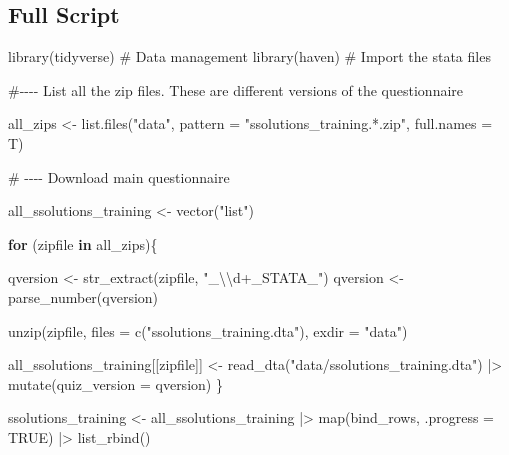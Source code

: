 \documentclass[
  letterpaper,
  DIV=11,
  numbers=noendperiod]{scrreprt}
\newenvironment{Shaded}{\begin{snugshade}}{\end{snugshade}}
\newcommand{\AttributeTok}[1]{\textcolor[rgb]{0.40,0.45,0.13}{#1}}
\newcommand{\CommentTok}[1]{\textcolor[rgb]{0.37,0.37,0.37}{#1}}
\newcommand{\ConstantTok}[1]{\textcolor[rgb]{0.56,0.35,0.01}{#1}}
\newcommand{\ControlFlowTok}[1]{\textcolor[rgb]{0.00,0.23,0.31}{\textbf{#1}}}
\newcommand{\FunctionTok}[1]{\textcolor[rgb]{0.28,0.35,0.67}{#1}}
\newcommand{\NormalTok}[1]{\textcolor[rgb]{0.00,0.23,0.31}{#1}}
\newcommand{\OtherTok}[1]{\textcolor[rgb]{0.00,0.23,0.31}{#1}}
\newcommand{\SpecialCharTok}[1]{\textcolor[rgb]{0.37,0.37,0.37}{#1}}
\newcommand{\StringTok}[1]{\textcolor[rgb]{0.13,0.47,0.30}{#1}}
\begin{document}
\subsection{Full Script}\label{full-script}

\begin{Shaded}
\begin{Highlighting}[]
\FunctionTok{library}\NormalTok{(tidyverse)          }\CommentTok{\# Data management}
\FunctionTok{library}\NormalTok{(haven)              }\CommentTok{\# Import the stata files}

\CommentTok{\#{-}{-}{-}{-} List all the zip files. These are different versions of the questionnaire}

\NormalTok{all\_zips }\OtherTok{\textless{}{-}} \FunctionTok{list.files}\NormalTok{(}\StringTok{"data"}\NormalTok{, }\AttributeTok{pattern =} \StringTok{"ssolutions\_training.*.zip"}\NormalTok{,}
                       \AttributeTok{full.names =}\NormalTok{ T)}


\CommentTok{\# {-}{-}{-}{-} Download main questionnaire}

\NormalTok{all\_ssolutions\_training }\OtherTok{\textless{}{-}} \FunctionTok{vector}\NormalTok{(}\StringTok{"list"}\NormalTok{)}

\ControlFlowTok{for}\NormalTok{ (zipfile }\ControlFlowTok{in}\NormalTok{ all\_zips)\{}

\NormalTok{  qversion }\OtherTok{\textless{}{-}} \FunctionTok{str\_extract}\NormalTok{(zipfile, }\StringTok{"\_}\SpecialCharTok{\textbackslash{}\textbackslash{}}\StringTok{d+\_STATA\_"}\NormalTok{)}
\NormalTok{  qversion }\OtherTok{\textless{}{-}} \FunctionTok{parse\_number}\NormalTok{(qversion)}


  \FunctionTok{unzip}\NormalTok{(zipfile, }\AttributeTok{files =} \FunctionTok{c}\NormalTok{(}\StringTok{"ssolutions\_training.dta"}\NormalTok{),}
        \AttributeTok{exdir =} \StringTok{"data"}\NormalTok{)}


\NormalTok{  all\_ssolutions\_training[[zipfile]] }\OtherTok{\textless{}{-}} \FunctionTok{read\_dta}\NormalTok{(}\StringTok{"data/ssolutions\_training.dta"}\NormalTok{) }\SpecialCharTok{|\textgreater{}}
    \FunctionTok{mutate}\NormalTok{(}\AttributeTok{quiz\_version =}\NormalTok{ qversion)}
\NormalTok{\}}



\NormalTok{ssolutions\_training }\OtherTok{\textless{}{-}}\NormalTok{ all\_ssolutions\_training }\SpecialCharTok{|\textgreater{}} 
  \FunctionTok{map}\NormalTok{(bind\_rows, }\AttributeTok{.progress =} \ConstantTok{TRUE}\NormalTok{) }\SpecialCharTok{|\textgreater{}}  
  \FunctionTok{list\_rbind}\NormalTok{() }


\end{Highlighting}
\end{Shaded}
\end{document}
